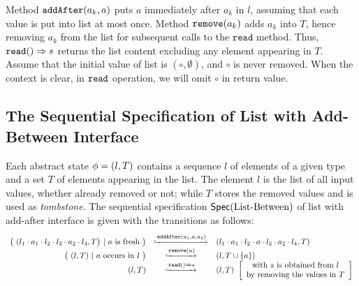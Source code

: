 Method $\alabelshort[\mathtt{addAfter}]{a_k,a}$ puts $a$ immediately after $a_k$ in $l$, assuming that each value is put into list at most once. Method $\alabelshort[\mathtt{remove}]{a_k}$ adds $a_k$ into $T$, hence removing $a_k$ from the list for subsequent calls to the $\mathtt{read}$ method. Thus, $\alabellong[\mathtt{read}]{}{s}{}$ returns the list content excluding any element appearing in $T$. Assume that the initial value of list is $(\circ,\emptyset)$, and $\circ$ is never removed. When the context is clear, in $\ensuremath{\tt read}$ operation, we will omit $\circ$ in return value.





\subsection{The Sequential Specification of List with Add-Between Interface}
\label{subsec:the sequential specification of list with add-between interface}

Each abstract state $\abstate = (l,T)$ contains a sequence $l$ of elements of a given type and a set $T$ of elements appearing in the list. The element $l$ is the list of all input values, whether already removed or not; while $T$ stores the removed values and is used as \emph{tombstone}. The sequential specification $\specWooki$ of list with add-after interface is given with the transitions as follows:
\[
  \begin{array}{rcl}
    \big(\ (l_1 \cdot a_1 \cdot l_2 \cdot l_3 \cdot a_2 \cdot l_4,T\big)\ |\ a\text{ is fresh}\ \big)
     & \specarrow{\alabelshort[\mathtt{addAfter}]{a_1,a,a_2}}
     & (l_1 \cdot a_1 \cdot l_2 \cdot a \cdot l_3 \cdot a_2 \cdot l_4,T)\\
     \big(\ (l,T)\ |\ a\ \text{occurs in}\ l\ \big)
     & \specarrow{\alabelshort[\mathtt{remove}]{a}}
     & (l,T \cup \{a\})\\
     (l,T)
     & \specarrow{\alabellong[\mathtt{read}]{}{s}{}}
     & (l,T)\
       \left[\begin{array}{c}
           \text{with $s$ is obtained from $l$}\\
           \text{by removing the values in $T$}
       \end{array}\right]
   \end{array}
\]

